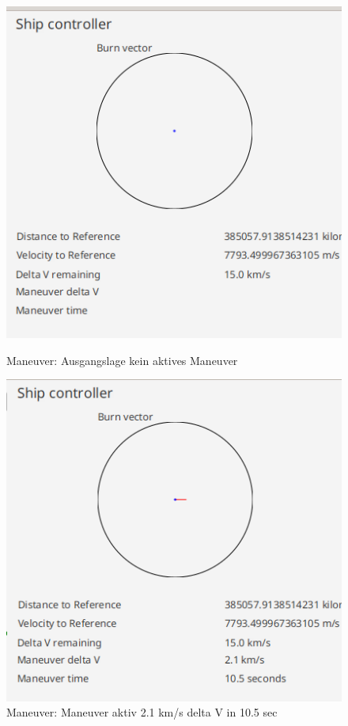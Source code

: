 \begin{figure}[H]
	\centering
	\begin{minipage}[b]{0.45\textwidth}
		\includegraphics[width=\textwidth]{res/burn1.png}
		\caption{Maneuver: Ausgangslage kein aktives Maneuver}
	\end{minipage}
	\hfill
	\begin{minipage}[b]{0.45\textwidth}
		\includegraphics[width=\textwidth]{res/burn2.png}
		\caption{Maneuver: Maneuver aktiv 2.1 km/s delta V in 10.5 sec}
	\end{minipage}
\end{figure}

